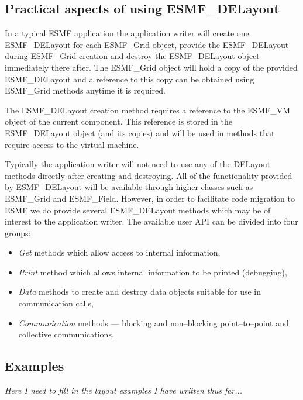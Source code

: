 
\subsection{Practical aspects of using ESMF\_DELayout}
In a typical ESMF application the application writer will create one ESMF\_DELayout for each ESMF\_Grid object, provide the ESMF\_DELayout during ESMF\_Grid creation and destroy the ESMF\_DELayout object immediately there after. The ESMF\_Grid object will hold a copy of the provided ESMF\_DELayout and a reference to this copy can be obtained using ESMF\_Grid methods anytime it is required.

The ESMF\_DELayout creation method requires a reference to the ESMF\_VM object of the current component. This reference is stored in the ESMF\_DELayout object (and its copies) and will be used in methods that require access to the virtual machine.

Typically the application writer will not need to use any of the DELayout methods directly after creating and destroying. All of the functionality provided by ESMF\_DELayout will be available through higher classes such as ESMF\_Grid and ESMF\_Field. However, in order to facilitate code migration to ESMF we do provide several ESMF\_DELayout methods which may be of interest to the application writer. The available user API can be divided into four groups:
\begin{itemize}
\item {\em Get} methods which allow access to internal information,
\item {\em Print} method which allows internal information to be printed (debugging),
\item {\em Data} methods to create and destroy data objects suitable for use in communication calls,
\item {\em Communication} methods --- blocking and non--blocking point--to--point and collective communications.
\end{itemize}

\subsection{Examples}
{\em Here I need to fill in the layout examples I have written thus far...}

